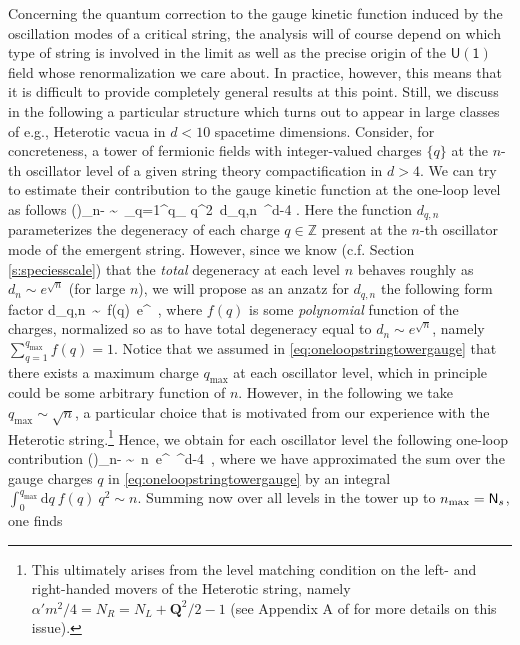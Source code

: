 Concerning the quantum correction to the gauge kinetic function induced by the oscillation modes of a critical string, the analysis will of course depend on which type of string is involved in the limit as well as the precise origin of the $\mathsf{U(1)}$ field whose renormalization we care about. In practice, however, this means that it is difficult to provide completely general results at this point. Still, we discuss in the following a particular structure which turns out to appear in large classes of e.g., Heterotic vacua in $d<10$ spacetime dimensions. Consider, for concreteness, a tower of fermionic fields with integer-valued charges $\{q\}$ at the $n$-th oscillator level of a given string theory compactification in $d>4$. We can try to estimate their contribution to the gauge kinetic function at the one-loop level as follows
%
\beq\label{eq:oneloopstringtowergauge}
	\delta \left(\right)\bigg\rvert_{n-} \sim\, \sum_{q=1}^{q_{}} q^2\, d_{q,n}\, \LSP^{d-4} .
\eeq
%
Here the function $d_{q,n}$ parameterizes the degeneracy of each charge $q\in \mathbb{Z}$ present at the $n$-th oscillator mode of the emergent string. However, since we know (c.f. Section \ref{s:speciesscale}) that the \emph{total} degeneracy at each level $n$ behaves roughly as $d_n \sim e^{\sqrt{n}}$ (for large $n$), we will propose as an anzatz for $d_{q,n}$ the following form factor 
%
\beq
\label{eq:stringytowerdensity}
	d_{q,n}\, \sim\, f(q)\, e^{}\, ,
\eeq
%
where $f(q)$ is some \emph{polynomial} function of the charges, normalized so as to have total degeneracy equal to $d_n \sim e^{\sqrt{n}}$, namely $\sum_{q=1}^{q_{\text{max}}} f(q) = 1$. Notice that we assumed in \eqref{eq:oneloopstringtowergauge} that there exists a maximum charge $q_{\text{max}}$ at each oscillator level, which in principle could be some arbitrary function of $n$. However, in the following we take $q_{\text{max}} \sim \sqrt{n}$, a particular choice that is motivated from our experience with the Heterotic string.\footnote{This ultimately arises from the level matching condition on the left- and right-handed movers of the Heterotic string, namely $\alpha'm^2/4=N_R =N_L+\textbf{Q}^2/2-1$ (see Appendix A of \cite{Castellano:2022bvr} for more details on this issue).}
Hence, we obtain for each oscillator level the following one-loop contribution
%
\beq
	\delta \left(\right)\bigg\rvert_{n-} \sim\, n\, e^{}\, \LSP^{d-4}\, ,
\eeq
%
where we have approximated the sum over the gauge charges $q$ in \eqref{eq:oneloopstringtowergauge} by an integral $\int_0^{q_{\text{max}}} \text{d}q\ f(q)\ q^2 \sim n$. Summing now over all levels in the tower up to $n_{\text{max}} = \mathsf{N}_s$, one finds
